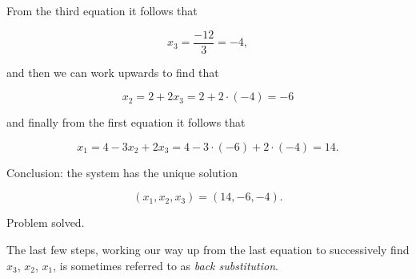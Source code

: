 \begin{ex}
From the third equation it follows that

$$

  x_3 = \dfrac{-12}{3} = -4,
$$

   and then we can work upwards to find that

$$
x_2 = 2 + 2x_3 = 2+2\cdot(-4) = -6
$$

and finally from the first equation it follows that

$$

    x_1 = 4 - 3x_2 + 2x_3 = 4 - 3\cdot(-6) + 2\cdot(-4) = 14.
$$

Conclusion: the system has the unique solution

$$

   (x_1,x_2,x_3) = (14,-6,-4).
$$

Problem solved.

The last few steps, working our way up from the last equation to successively find $x_3$, $x_2$, $x_1$, is sometimes referred to as \emph{back substitution}.
\end{ex}



